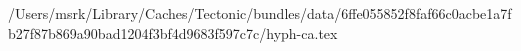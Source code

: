 /Users/msrk/Library/Caches/Tectonic/bundles/data/6ffe055852f8faf66c0acbe1a7fb27f87b869a90bad1204f3bf4d9683f597c7c/hyph-ca.tex